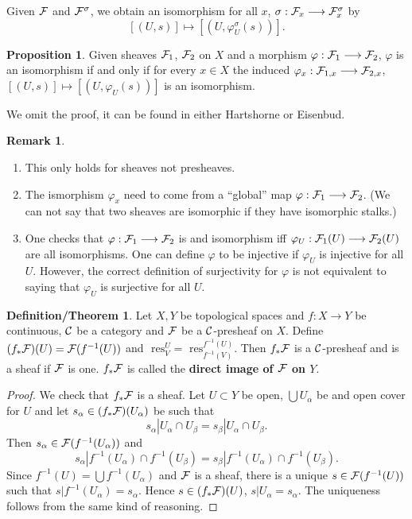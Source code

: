 \documentclass[11pt]{article}
\theoremstyle{definition}
\newtheorem{prop}[thm]{Proposition}
\newtheorem{rmk}[thm]{Remark}
\newtheorem{dfn/thm}[thm]{Definition/Theorem}
\newcommand{\res}{\text{ res}}
\newcommand{\calf}{{\cal F}}
\newcommand{\calc}{{\cal C}}
\begin{document}
Given $\calf$ and $\calf^\sigma$, we obtain an isomorphism for all $x$, $\sigma: \calf_x \longrightarrow \calf^\sigma_x$ by
$$
[(U,s)] \longmapsto [(U,\varphi^\sigma_U(s))].
$$

\begin{prop}
    Given sheaves $\calf_1$, $\calf_2$ on $X$ and a morphism $\varphi: \calf_1 \longrightarrow \calf_2$, $\varphi$ is an isomorphism if and only if for every $x\in X$ the induced $\varphi_x: \calf_{1,x} \longrightarrow \calf_{2,x}$, $[(U,s)] \longmapsto [(U, \varphi_U(s))]$ is an isomorphism.
\end{prop}

We omit the proof, it can be found in either Hartshorne or Eisenbud.

\begin{rmk}\ 
    \begin{enumerate}[label=(\arabic*)]
        \item 
        This only holds for sheaves not presheaves.
        \item
        The ismorphism $\varphi_x$ need to come from a ``global'' map $\varphi: \calf_1 \longrightarrow \calf_2$. (We can not say that two sheaves are isomorphic if they have isomorphic stalks.)
        \item
        One checks that $\varphi: \calf_1 \longrightarrow \calf_2$ is and isomorphism iff $\varphi_U: \calf_1(U) \longrightarrow \calf_2(U)$ are all isomorphisms. One can define $\varphi$ to be injective if $\varphi_U$ is injective for all $U$. However, the correct definition of surjectivity for $\varphi$ is not equivalent to saying that $\varphi_U$ is surjective for all $U$.
    \end{enumerate}
\end{rmk}

\begin{dfn/thm}
    Let $X,Y$ be topological spaces and $f:X\longrightarrow Y$ be continuous, $\calc$ be a category and $\calf$ be a $\calc$-presheaf on $X$. Define $(f_* \calf)(U)=\calf (f^{-1}(U))$ and $\res_V^U = \res_{f^{-1}(V)}^{f^{-1}(U)}$. Then $f_*\calf$ is a $\calc$-presheaf and is a sheaf if $\calf$ is one.
    $f_*\calf$ is called the \textbf{direct image of $\calf$ on $Y$}.
\end{dfn/thm}

\begin{proof}
    We check that $f_*\calf$ is a sheaf. Let $U\subset Y$ be open, $\bigcup U_\alpha$ be and open cover for $U$ and let $s_\alpha \in (f_* \calf)(U_\alpha)$ be such that 
    $$
    s_\alpha|U_\alpha\cap U_\beta = s_\beta|U_\alpha \cap U_\beta.
    $$
    Then $s_\alpha \in \calf(f^{-1}(U_\alpha))$ and
    $$
    s_\alpha|f^{-1}(U_\alpha)\cap f^{-1}(U_\beta) = s_\beta|f^{-1}(U_\alpha) \cap f^{-1}(U_\beta).
    $$
    Since $f^{-1}(U) = \bigcup f^{-1}(U_\alpha)$ and $\calf$ is a sheaf, there is a unique $s\in\calf(f^{-1}(U))$ such that $s|f^{-1}(U_\alpha) = s_\alpha$. Hence $s \in (f_*\calf)(U)$, $s|U_\alpha = s_\alpha$. The uniqueness follows from the same kind of reasoning.
\end{proof}
\end{document}
